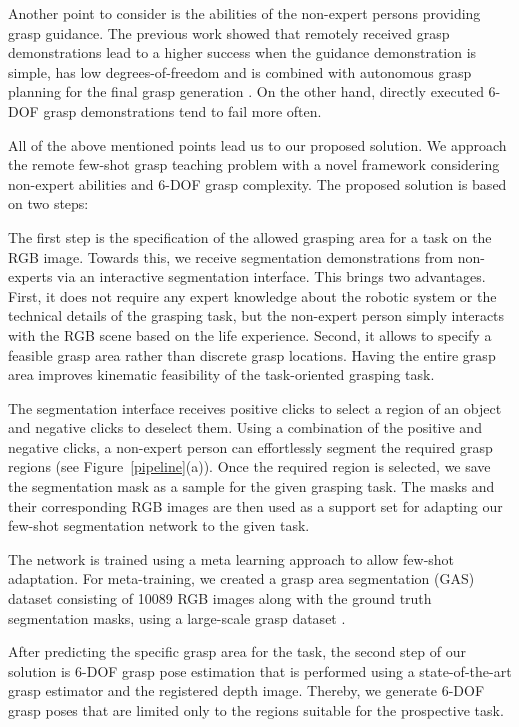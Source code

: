 \documentclass[letterpaper]{article} %
\begin{document}
Another point to consider is the abilities of the non-expert persons providing grasp guidance. The previous work showed that remotely received grasp demonstrations lead to a higher success when the guidance demonstration is simple, has low degrees-of-freedom and is combined with autonomous grasp planning for the final grasp generation \cite{leeper2012strategies,kent2020leveraging}. On the other hand, directly executed 6-DOF grasp demonstrations tend to fail more often. 

All of the above mentioned points lead us to our proposed solution. We approach the remote few-shot grasp teaching problem with a novel framework considering non-expert abilities and 6-DOF grasp complexity. The proposed solution is based on two steps:

The first step is the specification of the allowed grasping area for a task on the RGB image. Towards this, we receive segmentation demonstrations from non-experts via an interactive segmentation interface. This brings two advantages. First, it does not require any expert knowledge about the robotic system or the technical details of the grasping task, but the non-expert person simply interacts with the RGB scene based on the life experience. Second, it allows to specify a feasible grasp area rather than discrete grasp locations. Having the entire grasp area improves kinematic feasibility of the task-oriented grasping task.

The segmentation interface receives positive clicks to select a region of an object and negative clicks to deselect them. Using a combination of the positive and negative clicks, a non-expert person can effortlessly segment the required grasp regions (see Figure~\ref{pipeline}(a)). Once the required region is selected, we save the segmentation mask as a sample for the given grasping task. The masks and their corresponding RGB images are then used as a support set for adapting our few-shot segmentation network to the given task. 


The network is trained using a meta learning approach \cite{nichol2018reptile} to allow few-shot adaptation. For meta-training, we created a grasp area segmentation (GAS) dataset consisting of 10089 RGB images along with the ground truth segmentation masks, using a large-scale grasp dataset \cite{fang2020graspnet}.

After predicting the specific grasp area for the task, the second step of our solution is 6-DOF grasp pose estimation that is performed using a state-of-the-art grasp estimator \cite{sundermeyer2021contact} and the registered depth image. Thereby, we generate 6-DOF grasp poses that are limited only to the regions suitable for the prospective task. 
\end{document}
